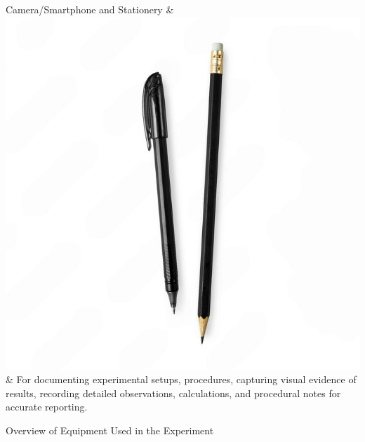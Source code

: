 \documentclass{article}
\begin{document}
\begin{table}[H]
\begin{tblr}
        Camera/Smartphone and Stationery & \includegraphics[width=\imas,valign=c]{images/stationary.png} & For documenting experimental setups, procedures, capturing visual evidence of results, recording detailed observations, calculations, and procedural notes for accurate reporting. \\
    \end{tblr}
    \caption{Overview of Equipment Used in the Experiment}
    \label{tab:equipment_overview}
\end{table}

    

\newcommand{\mr}[2]{%
    \begin{varwidth}{#2}%
        #1%
    \end{varwidth}%
}
\end{document}
